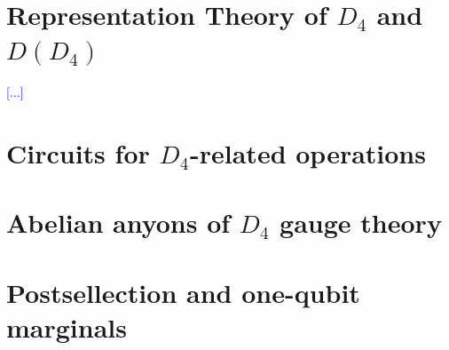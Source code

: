 \documentclass[two column]{article}
\newcommand{\jovan}[1]{\textcolor{blue}{[#1]}}
\begin{document}
\section{Representation Theory of $D_4$ and $D(D_4)$}\label{app:reps}
\jovan{$\ldots$}

\section{Circuits for $D_4$-related operations}\label{app:cirqs}

\section{Abelian anyons of $D_4$ gauge theory}\label{app:abl}

\section{Postsellection and one-qubit marginals}\label{app:marg}
\end{document}
